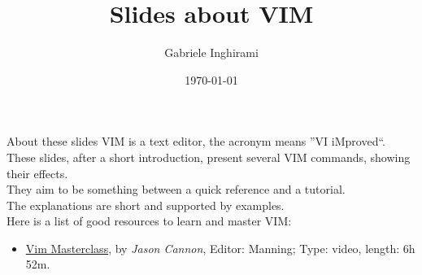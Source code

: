 

    
    \author[Gabriele Inghirami]{Gabriele Inghirami}
    \title[Slides about VIM]{Slides about VIM}
    \date{\today}
    \maketitle
    
    \begin{frame}{About these slides}
    VIM is a text editor, the acronym means ''VI iMproved``.\\
    These slides, after a short introduction, present several VIM commands, showing their effects.\\
    They aim to be something between a quick reference and a tutorial.\\
    The explanations are short and supported by examples.\\
    Here is a list of good resources to learn and master VIM:
    \begin{itemize}
        \item \href{https://www.manning.com/livevideo/vim-masterclass}{Vim Masterclass}, by \emph{Jason Cannon}, Editor: Manning;  Type: video, length: 6h 52m.
    \end{itemize}
    \end{frame}
    
     

